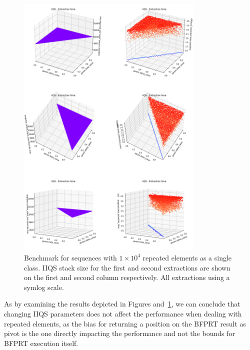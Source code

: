 \begin{figure}[p]
    \centering
    \includegraphics[width=0.8\textwidth]{./fragments/04_experimental_execution/images/04_alphabeta_singleclass_stack.png}
    \caption{Benchmark for sequences with $1\times10^4$ repeated elements as a single class. IIQS stack size for the first and second extractions are shown on the first and second column respectively. All extractions using a symlog scale.}
    \label{FIG:05_ALPHABETA_RELATIONSHIP_SINGLECLASS_STACK}
\end{figure}

As by examining the results depicted in Figures and~\ref{FIG:05_ALPHABETA_RELATIONSHIP_SINGLECLASS_STACK}, we can conclude that changing IIQS parameters does not affect the performance when dealing with repeated elements, as the bias for returning a position on the BFPRT result as pivot is the one directly impacting the performance and not the bounds for BFPRT execution itself.

